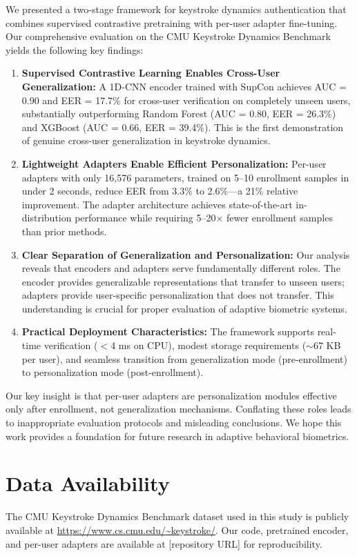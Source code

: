 \documentclass{ieeeaccess}
\begin{document}
{We presented a two-stage framework for keystroke dynamics authentication that combines supervised contrastive pretraining with per-user adapter fine-tuning. Our comprehensive evaluation on the CMU Keystroke Dynamics Benchmark yields the following key findings:

\begin{enumerate}
\item \textbf{Supervised Contrastive Learning Enables Cross-User Generalization:} A 1D-CNN encoder trained with SupCon achieves AUC = 0.90 and EER = 17.7\% for cross-user verification on completely unseen users, substantially outperforming Random Forest (AUC = 0.80, EER = 26.3\%) and XGBoost (AUC = 0.66, EER = 39.4\%). This is the first demonstration of genuine cross-user generalization in keystroke dynamics.

\item \textbf{Lightweight Adapters Enable Efficient Personalization:} Per-user adapters with only 16,576 parameters, trained on 5--10 enrollment samples in under 2 seconds, reduce EER from 3.3\% to 2.6\%---a 21\% relative improvement. The adapter architecture achieves state-of-the-art in-distribution performance while requiring 5--20$\times$ fewer enrollment samples than prior methods.

\item \textbf{Clear Separation of Generalization and Personalization:} Our analysis reveals that encoders and adapters serve fundamentally different roles. The encoder provides generalizable representations that transfer to unseen users; adapters provide user-specific personalization that does not transfer. This understanding is crucial for proper evaluation of adaptive biometric systems.

\item \textbf{Practical Deployment Characteristics:} The framework supports real-time verification ($<$4 ms on CPU), modest storage requirements ($\sim$67 KB per user), and seamless transition from generalization mode (pre-enrollment) to personalization mode (post-enrollment).
\end{enumerate}

Our key insight is that per-user adapters are personalization modules effective only after enrollment, not generalization mechanisms. Conflating these roles leads to inappropriate evaluation protocols and misleading conclusions. We hope this work provides a foundation for future research in adaptive behavioral biometrics.

\section*{Data Availability}
The CMU Keystroke Dynamics Benchmark dataset used in this study is publicly available at \url{https://www.cs.cmu.edu/~keystroke/}. Our code, pretrained encoder, and per-user adapters are available at [repository URL] for reproducibility.

}
\end{document}
